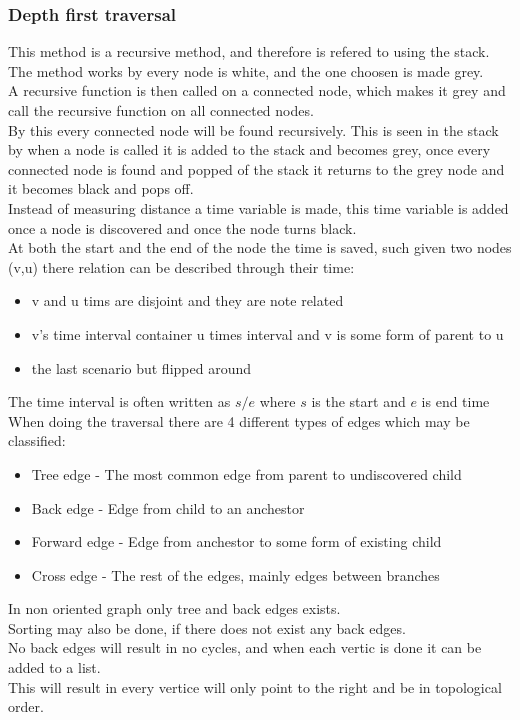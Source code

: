 \documentclass[12pt, a4paper]{article}
\begin{document}
			\subsubsection{Depth first traversal}
				This method is a recursive method, and therefore is refered to using the stack.\\
				The method works by every node is white, and the one choosen is made grey.\\
				A recursive function is then called on a connected node, which makes it grey and call the recursive function on all connected nodes.\\
				By this every connected node will be found recursively. This is seen in the stack by when a node is called it is added to the stack and becomes grey, once every connected node is found and popped of the stack it returns to the grey node and it becomes black and pops off.\\
				Instead of measuring distance a time variable is made, this time variable is added once a node is discovered and once the node turns black.\\
				At both the start and the end of the node the time is saved, such given two nodes (v,u) there relation can be described through their time:
				\begin{itemize}
					\item v and u tims are disjoint and they are note related
					\item v's time interval container u times interval and v is some form of parent to u
					\item the last scenario but flipped around
				\end{itemize}
				The time interval is often written as $s/e$ where $s$ is the start and $e$ is end time\\
				When doing the traversal there are 4 different types of edges which may be classified:
				\begin{itemize}
					\item Tree edge - The most common edge from parent to undiscovered child
					\item Back edge - Edge from child to an anchestor  
					\item Forward edge - Edge from anchestor to some form of existing child
					\item Cross edge - The rest of the edges, mainly edges between branches
				\end{itemize}
				In non oriented graph only tree and back edges exists.\\[4mm]
				Sorting may also be done, if there does not exist any back edges.\\
				No back edges will result in no cycles, and when each vertic is done it can be added to a list.\\
				This will result in every vertice will only point to the right and be in topological order.
\end{document}
